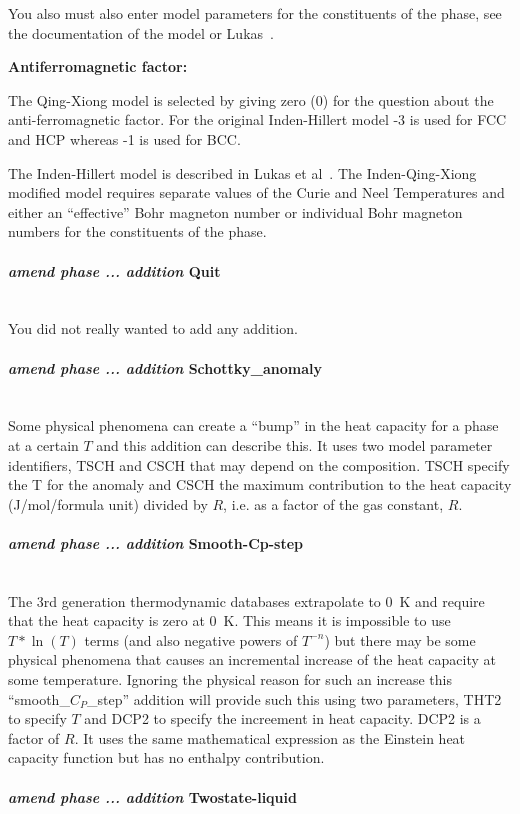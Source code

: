 \documentclass[11pt]{article}
\newcommand{\subsubsubsection}[1]{\paragraph{#1}\mbox{}\\}
\begin{document}
You also must also enter model parameters for the constituents of the
phase, see the documentation of the model or Lukas~\cite{07Luk}.

{\bf Antiferromagnetic factor:}

The Qing-Xiong model is selected by giving zero (0) for the question
about the anti-ferromagnetic factor.  For the original Inden-Hillert
model -3 is used for FCC and HCP whereas -1 is used for BCC.

The Inden-Hillert model is described in Lukas et al~\cite{07Luk}.  The
Inden-Qing-Xiong modified model requires separate values of the Curie
and Neel Temperatures and either an ``effective'' Bohr magneton number
or individual Bohr magneton numbers for the constituents of the phase.

\hypertarget{Amend addition quit}{}
\subsubsubsection{{\em amend phase ... addition} Quit}

You did not really wanted to add any addition.

\hypertarget{Amend Schottky-anomaly}{}
\subsubsubsection{{\em amend phase ... addition} Schottky\_anomaly}

Some physical phenomena can create a ``bump'' in the heat capacity for
a phase at a certain $T$ and this addition can describe this.  It uses
two model parameter identifiers, TSCH and CSCH that may depend on the
composition.  TSCH specify the T for the anomaly and CSCH the maximum
contribution to the heat capacity (J/mol/formula unit) divided by $R$,
i.e. as a factor of the gas constant, $R$.

\hypertarget{Amend smooth-Cp-step}{}
\subsubsubsection{{\em amend phase ... addition} Smooth-Cp-step}

The 3rd generation thermodynamic databases extrapolate to 0~K and
require that the heat capacity is zero at 0~K.  This means it is
impossible to use $T*\ln(T)$ terms (and also negative powers of
$T^{-n}$) but there may be some physical phenomena that causes an
incremental increase of the heat capacity at some temperature.
Ignoring the physical reason for such an increase this
``smooth\_$C_P$\_step'' addition will provide such this using two
parameters, THT2 to specify $T$ and DCP2 to specify the increement in
heat capacity.  DCP2 is a factor of $R$.  It uses the same
mathematical expression as the Einstein heat capacity function but has
no enthalpy contribution.

\hypertarget{Amend twostate liquid}{}
\subsubsubsection{{\em amend phase ... addition} Twostate-liquid}
\end{document}
